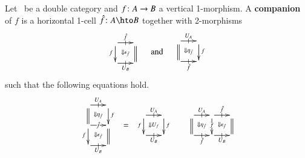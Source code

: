 \documentclass{amsart}
\begin{document}
\begin{defn}\label{def:companion}
  Let \lD\ be a double category and $f\colon A\to B$ a vertical
  1-morphism.  A \textbf{companion} of $f$ is a horizontal 1-cell
  $\fhat\maps A\hto B$ together with 2-morphisms
  \begin{equation*}
    \begin{array}{c}
      \xymatrix@-.5pc{
        \ar[r]|-@{|}^-{\fhat} \ar[d]_f \ar@{}[dr]|{\Downarrow \epsilon_{\hat{f}} }
        & \ar@{=}[d]\\
        \ar[r]|-@{|}_-{U_B} & }
    \end{array}\quad\text{and}\quad
    \begin{array}{c}
      \xymatrix@-.5pc{
        \ar[r]|-@{|}^-{U_A} \ar@{=}[d] \ar@{}[dr]|{\Downarrow \eta_{\hat{f}}}
        & \ar[d]^f\\
        \ar[r]|-@{|}_-{\fhat} & }
    \end{array}
  \end{equation*}
  such that the following equations hold.
  \begin{align}\label{eq:compeqn}
    \begin{array}{c}
      \xymatrix@-.5pc{
        \ar[r]|-@{|}^-{U_A} \ar@{=}[d] \ar@{}[dr]|{\Downarrow \eta_{\hat{f}}}
        & \ar[d]^f\\
        \ar[r]|-{\fhat} \ar[d]_f \ar@{}[dr]|
        {\Downarrow  \epsilon_{\hat{f}} }
        & \ar@{=}[d]\\
        \ar[r]|-@{|}_-{U_B} & }
    \end{array} &= 
    \begin{array}{c}
      \xymatrix@-.5pc{ \ar[r]|-@{|}^-{U_A} \ar[d]_f
        \ar@{}[dr]|{\Downarrow U_f} &  \ar[d]^f\\
        \ar[r]|-@{|}_-{U_B} & }
    \end{array}
    &
    \begin{array}{c}
      \xymatrix@-.5pc{
        \ar[r]|-@{|}^-{U_A} \ar@{=}[d] \ar@{}[dr]|{ \Downarrow \eta_{\hat{f}}}&
        \ar[r]|-@{|}^{\fhat}\ar[d]|f \ar@{}[dr]|{\Downarrow  \epsilon_{\hat{f}} }
        & \ar@{=}[d]\\
        \ar[r]|-@{|}_-{\fhat} &
        \ar[r]|-@{|}_-{U_B} &}

\end{array}
\end{align}
\end{defn}
\end{document}
